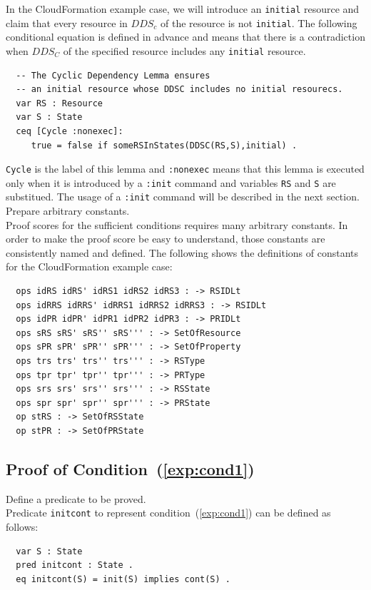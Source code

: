 \documentclass[12pt]{report}
\begin{document}
In the CloudFormation example case, we will introduce an {\tt initial}
resource and claim that every resource in $DDS_c$ of the resource is
not {\tt initial}. The following conditional equation is defined in
advance and means that there is a contradiction when $DDS_C$ of the
specified resource includes any {\tt initial} resource.
\small
\begin{verbatim}
  -- The Cyclic Dependency Lemma ensures
  -- an initial resource whose DDSC includes no initial resourecs.
  var RS : Resource
  var S : State
  ceq [Cycle :nonexec]: 
     true = false if someRSInStates(DDSC(RS,S),initial) .
\end{verbatim}
\normalsize
{\tt Cycle} is the label of this lemma and {\tt :nonexec} means that
this lemma is executed only when it is introduced by a {\tt :init}
command and variables {\tt RS} and {\tt S} are substitued. The usage
of a {\tt :init} command will be described in the next section.\\

 Prepare arbitrary constants. \\
Proof scores for the sufficient conditions requires many arbitrary constants.
In order to make the proof score be easy to understand, those constants
are consistently named and defined. The following shows the definitions
of constants for the CloudFormation example case:
\small
\begin{verbatim}
  ops idRS idRS' idRS1 idRS2 idRS3 : -> RSIDLt
  ops idRRS idRRS' idRRS1 idRRS2 idRRS3 : -> RSIDLt
  ops idPR idPR' idPR1 idPR2 idPR3 : -> PRIDLt
  ops sRS sRS' sRS'' sRS''' : -> SetOfResource
  ops sPR sPR' sPR'' sPR''' : -> SetOfProperty
  ops trs trs' trs'' trs''' : -> RSType
  ops tpr tpr' tpr'' tpr''' : -> PRType
  ops srs srs' srs'' srs''' : -> RSState
  ops spr spr' spr'' spr''' : -> PRState
  op stRS : -> SetOfRSState
  op stPR : -> SetOfPRState
\end{verbatim}
\normalsize
\subsection{Proof of Condition~(\ref{exp:cond1})}
\label{sec:TOSCAinitcont}
 Define a predicate to be proved. \\
Predicate {\tt initcont} to represent condition~(\ref{exp:cond1}) can be defined as follows:
\small
\begin{verbatim}
  var S : State
  pred initcont : State .
  eq initcont(S) = init(S) implies cont(S) .
\end{verbatim}
\normalsize
\end{document}
